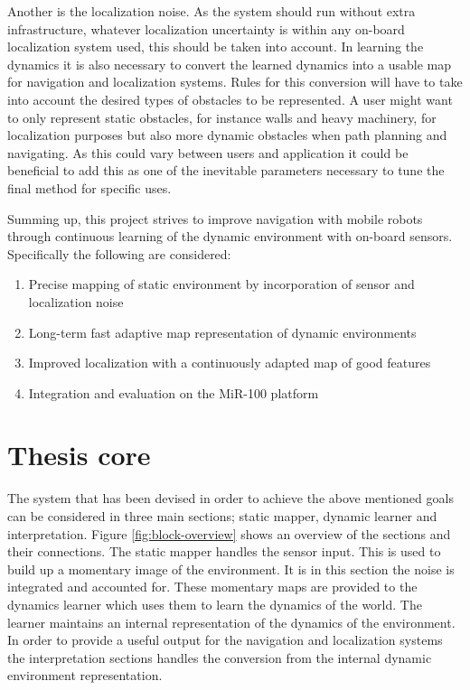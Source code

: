Another is the localization noise.
As the system should run without extra infrastructure, whatever localization uncertainty is within any on-board localization system used, this should be taken into account.
In learning the dynamics it is also necessary to convert the learned dynamics into a usable map for navigation and localization systems. Rules for this conversion will have to take into account the desired types of obstacles to be represented. 
A user might want to only represent static obstacles, for instance walls and heavy machinery, for localization purposes but also more dynamic obstacles when path planning and navigating. 
As this could vary between users and application it could be beneficial to add this as one of the inevitable parameters necessary to tune the final method for specific uses. 

Summing up, this project strives to improve navigation with mobile robots through continuous learning of the dynamic environment with on-board sensors. 
Specifically the following are considered:
\begin{enumerate}
    \item Precise mapping of static environment by incorporation of sensor and localization noise
    \item Long-term fast adaptive map representation of dynamic environments
    \item Improved localization with a continuously adapted map of good features
    \item Integration and evaluation on the MiR-100 platform
\end{enumerate}

\section{Thesis core}
The system that has been devised in order to achieve the above mentioned goals can be considered in three main sections; static mapper, dynamic learner and interpretation. 
Figure \ref{fig:block-overview} shows an overview of the sections and their connections. 
The static mapper handles the sensor input. This is used to build up a momentary image of the environment. It is in this section the noise is integrated and accounted for. 
These momentary maps are provided to the dynamics learner which uses them to learn the dynamics of the world. 
The learner maintains an internal representation of the dynamics of the environment. 
In order to provide a useful output for the navigation and localization systems the interpretation sections handles the conversion from the internal dynamic environment representation. 

